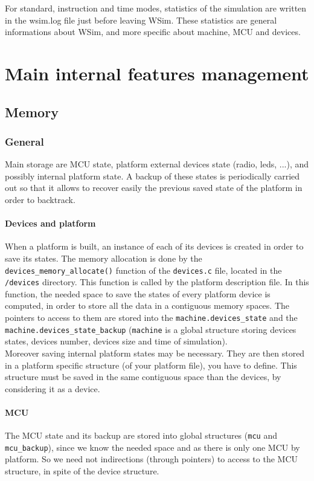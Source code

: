 \documentclass[a4paper,10pt]{report}
\begin{document}
For standard, instruction and time modes, statistics of the simulation are written in the wsim.log file just before leaving WSim. These statistics are general informations about WSim, and more specific about machine, MCU and devices.


\chapter{Main internal features management}

\section{Memory}
\subsection{General}
Main storage are MCU state, platform external devices state (radio,
leds, ...), and possibly internal platform state. A backup of these
states is periodically carried out so that it allows to recover easily
the previous saved state of the platform in order to backtrack.

\subsubsection{Devices and platform}
When a platform is built, an instance of each of its devices is created in order to save its states. The memory allocation  is done by the \verb$devices_memory_allocate()$ function of the \verb$devices.c$ file, located in the \verb$/devices$ directory. This function is called by the platform description file. In this function, the needed space to save the states of every platform device is computed, in order to store all the data in a contiguous memory spaces.  The pointers to access to them are stored into the \verb$machine.devices_state$ and the \verb$machine.devices_state_backup$ (\verb$machine$ is a global structure storing devices states, devices number, devices size and time of simulation).\\

Moreover saving internal platform states may be necessary. They are
then stored in a platform specific structure (of your platform file),
you have to define. This structure must be saved in the same
contiguous space than the devices, by considering it as a device.

\subsubsection{MCU}
The MCU state and its backup are stored into global structures
(\verb$mcu$ and \verb$mcu_backup$), since we know the needed space and
as there is only one MCU by platform. So we need not indirections
(through pointers) to access to the MCU structure, in spite of the
device structure.
\end{document}
